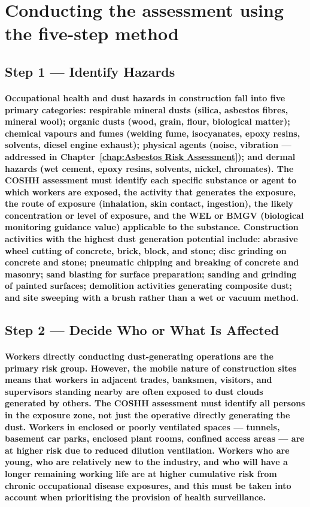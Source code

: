 \section{Conducting the assessment using the five-step method}

\subsection{Step 1 --- Identify Hazards}
\paragraph{Occupational health and dust hazards in construction fall into five primary categories: respirable mineral dusts (silica, asbestos fibres, mineral wool); organic dusts (wood, grain, flour, biological matter); chemical vapours and fumes (welding fume, isocyanates, epoxy resins, solvents, diesel engine exhaust); physical agents (noise, vibration --- addressed in Chapter~\ref{chap:Asbestos Risk Assessment}); and dermal hazards (wet cement, epoxy resins, solvents, nickel, chromates). The COSHH assessment must identify each specific substance or agent to which workers are exposed, the activity that generates the exposure, the route of exposure (inhalation, skin contact, ingestion), the likely concentration or level of exposure, and the WEL or BMGV (biological monitoring guidance value) applicable to the substance. Construction activities with the highest dust generation potential include: abrasive wheel cutting of concrete, brick, block, and stone; disc grinding on concrete and stone; pneumatic chipping and breaking of concrete and masonry; sand blasting for surface preparation; sanding and grinding of painted surfaces; demolition activities generating composite dust; and site sweeping with a brush rather than a wet or vacuum method.}

\subsection{Step 2 --- Decide Who or What Is Affected}
\paragraph{Workers directly conducting dust-generating operations are the primary risk group. However, the mobile nature of construction sites means that workers in adjacent trades, banksmen, visitors, and supervisors standing nearby are often exposed to dust clouds generated by others. The COSHH assessment must identify all persons in the exposure zone, not just the operative directly generating the dust. Workers in enclosed or poorly ventilated spaces --- tunnels, basement car parks, enclosed plant rooms, confined access areas --- are at higher risk due to reduced dilution ventilation. Workers who are young, who are relatively new to the industry, and who will have a longer remaining working life are at higher cumulative risk from chronic occupational disease exposures, and this must be taken into account when prioritising the provision of health surveillance.}

